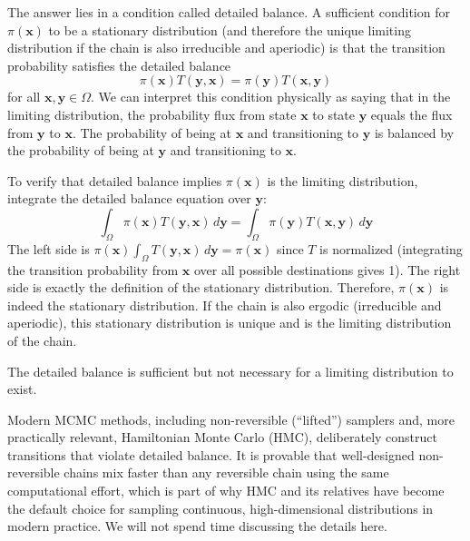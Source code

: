 The answer lies in a condition called detailed balance. A sufficient condition for $\pi(\mathbf{x})$ to be a stationary distribution (and therefore the unique limiting distribution if the chain is also irreducible and aperiodic) is that the transition probability satisfies the detailed balance
\begin{equation}
    \pi(\mathbf{x}) T(\mathbf{y}, \mathbf{x}) = \pi(\mathbf{y}) T(\mathbf{x}, \mathbf{y})
\end{equation}
for all $\mathbf{x}, \mathbf{y} \in \Omega$. We can interpret this condition physically as saying that in the limiting distribution, the probability flux from state $\mathbf{x}$ to state $\mathbf{y}$ equals the flux from $\mathbf{y}$ to $\mathbf{x}$. The probability of being at $\mathbf{x}$ and transitioning to $\mathbf{y}$ is balanced by the probability of being at $\mathbf{y}$ and transitioning to $\mathbf{x}$.

To verify that detailed balance implies $\pi(\mathbf{x})$ is the limiting distribution, integrate the detailed balance equation over $\mathbf{y}$:
\begin{equation}
    \int_{\Omega} \pi(\mathbf{x}) T(\mathbf{y}, \mathbf{x}) \, d\mathbf{y} = \int_{\Omega} \pi(\mathbf{y}) T(\mathbf{x}, \mathbf{y}) \, d\mathbf{y}
\end{equation}
The left side is $\pi(\mathbf{x}) \int_{\Omega} T(\mathbf{y}, \mathbf{x}) \, d\mathbf{y} = \pi(\mathbf{x})$ since $T$ is normalized (integrating the transition probability from $\mathbf{x}$ over all possible destinations gives 1). The right side is exactly the definition of the stationary distribution. Therefore, $\pi(\mathbf{x})$ is indeed the stationary distribution. If the chain is also ergodic (irreducible and aperiodic), this stationary distribution is unique and is the limiting distribution of the chain.

The detailed balance is sufficient but not necessary for a limiting distribution to exist.

Modern MCMC methods, including non-reversible (``lifted'') samplers and, more practically relevant, Hamiltonian Monte Carlo (HMC), deliberately construct transitions that violate detailed balance. It is provable that well-designed non-reversible chains mix faster than any reversible chain using the same computational effort, which is part of why HMC and its relatives have become the default choice for sampling continuous, high-dimensional distributions in modern practice. We will not spend time discussing the details here.

